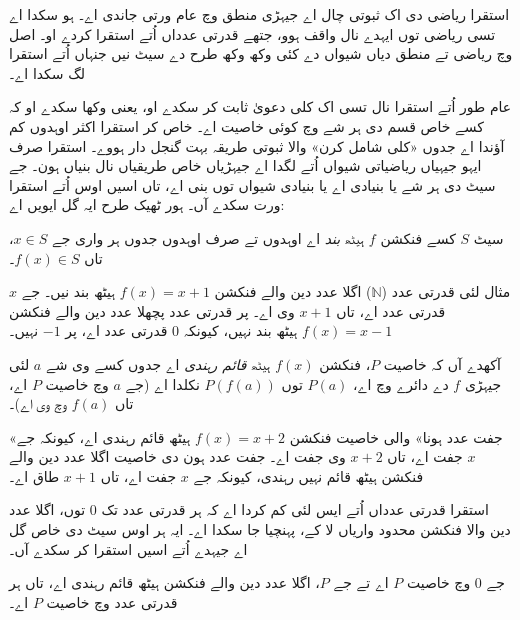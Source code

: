 \documentclass[../../include/open-logic-section]{subfiles}
\begin{document}


\begin{explain}
استقرا ریاضی دی اک ثبوتی چال اے جیہڑی منطق وچ عام ورتی جاندی اے۔ ہو سکدا اے تسی ریاضی توں ایہدے نال واقف ہوو، جتھے قدرتی عدداں اُتے استقرا کردے او۔ اصل وچ ریاضی تے منطق دیاں شیواں دے کئی وکھ وکھ طرح دے سیٹ نیں جنہاں اُتے استقرا لگ سکدا اے۔

عام طور اُتے استقرا نال تسی اک کلی دعویٰ ثابت کر سکدے او، یعنی وکھا سکدے او کہ کسے خاص قسم دی ہر شے وچ کوئی خاصیت اے۔ خاص کر استقرا اکثر اوہدوں کم آؤندا اے جدوں «کلی شامل کرن» والا ثبوتی طریقہ بہت گنجل دار ہووے۔ استقرا صرف ایہو جیہیاں ریاضیاتی شیواں اُتے لگدا اے جیہڑیاں خاص طریقیاں نال بنیاں ہون۔ جے سیٹ دی ہر شے یا بنیادی اے یا بنیادی شیواں توں بنی اے، تاں اسیں اوس اُتے استقرا ورت سکدے آں۔ ہور ٹھیک طرح ایہ گل ایویں اے:
\end{explain}

\begin{defn}
سیٹ $S$ کسے فنکشن $f$ ہیٹھ \emph{بند} اے اوہدوں تے صرف اوہدوں جدوں ہر واری جے $x \in
S$، تاں $f(x) \in S$۔
\end{defn}

\begin{explain}
مثال لئی قدرتی عدد ($\mathbb{N}$) اگلا عدد دین والے فنکشن $f(x) = x+1$ ہیٹھ بند نیں۔ جے $x$ قدرتی عدد اے، تاں $x+1$ وی اے۔ پر قدرتی عدد پچھلا عدد دین والے فنکشن $f(x) = x-1$ ہیٹھ بند نہیں، کیونکہ $0$ قدرتی عدد اے، پر $-1$ نہیں۔
\end{explain}

\begin{defn}
آکھدے آں کہ خاصیت $P$، فنکشن $f(x)$ ہیٹھ \emph{قائم رہندی} اے جدوں کسے وی شے $a$ لئی جیہڑی $f$ دے دائرے وچ اے، $P(a)$ توں $P(f(a))$ نکلدا اے (جے $a$ وچ خاصیت $P$ اے، تاں $f(a)$ وچ وی اے)۔
\end{defn}

\begin{explain}
«جفت عدد ہونا» والی خاصیت فنکشن $f(x) = x+2$ ہیٹھ قائم رہندی اے، کیونکہ جے $x$ جفت اے، تاں $x+2$ وی جفت اے۔ جفت عدد ہون دی خاصیت اگلا عدد دین والے فنکشن ہیٹھ قائم نہیں رہندی، کیونکہ جے $x$ جفت اے، تاں $x+1$ طاق اے۔

استقرا قدرتی عدداں اُتے ایس لئی کم کردا اے کہ ہر قدرتی عدد تک 0 توں، اگلا عدد دین والا فنکشن محدود واریاں لا کے، پہنچیا جا سکدا اے۔ ایہ ہر اوس سیٹ دی خاص گل اے جیہدے اُتے اسیں استقرا کر سکدے آں۔
\end{explain}

\begin{defn}
جے 0 وچ خاصیت $P$ اے تے جے $P$، اگلا عدد دین والے فنکشن ہیٹھ قائم رہندی اے، تاں ہر قدرتی عدد وچ خاصیت $P$ اے۔
\end{defn}
\end{document}
